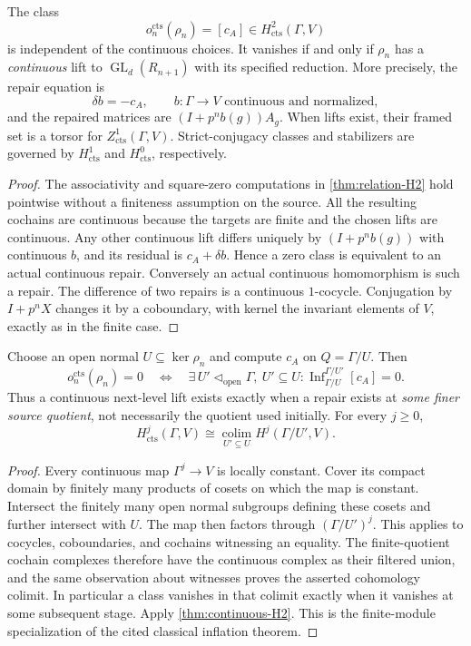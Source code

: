 \begin{theorem}\label{thm:continuous-H2}
The class
\[
 o_n^{\mathrm{cts}}(\rho_n)=[c_A]\in H^2_{\mathrm{cts}}(\Gamma,V)
\]
is independent of the continuous choices. It vanishes if and only if $\rho_n$ has a \emph{continuous} lift to $\operatorname{GL}_d(R_{n+1})$ with its specified reduction. More precisely, the repair equation is
\[
 \delta b=-c_A,\qquad b:\Gamma\to V\text{ continuous and normalized},
\]
and the repaired matrices are $(I+p^nb(g))A_g$. When lifts exist, their framed set is a torsor for $Z^1_{\mathrm{cts}}(\Gamma,V)$. Strict-conjugacy classes and stabilizers are governed by $H^1_{\mathrm{cts}}$ and $H^0_{\mathrm{cts}}$, respectively.
\end{theorem}
\begin{proof}
The associativity and square-zero computations in \cref{thm:relation-H2} hold pointwise without a finiteness assumption on the source. All the resulting cochains are continuous because the targets are finite and the chosen lifts are continuous. Any other continuous lift differs uniquely by $(I+p^nb(g))$ with continuous $b$, and its residual is $c_A+\delta b$. Hence a zero class is equivalent to an actual continuous repair. Conversely an actual continuous homomorphism is such a repair. The difference of two repairs is a continuous $1$-cocycle. Conjugation by $I+p^nX$ changes it by a coboundary, with kernel the invariant elements of $V$, exactly as in the finite case.
\end{proof}

\begin{theorem}\label{thm:source-inflation}
Choose an open normal $U\subseteq\ker\rho_n$ and compute $c_A$ on $Q=\Gamma/U$. Then
\[
 o_n^{\mathrm{cts}}(\rho_n)=0
 \quad\Longleftrightarrow\quad
 \exists\, U'\triangleleft_{\mathrm{open}}\Gamma,\ U'\subseteq U:
 \operatorname{Inf}_{\Gamma/U}^{\Gamma/U'}[c_A]=0.
\]
Thus a continuous next-level lift exists exactly when a repair exists at \emph{some finer source quotient}, not necessarily the quotient used initially. For every $j\geq0$,
\[
 H^j_{\mathrm{cts}}(\Gamma,V)
 \cong\underset{U'\subseteq U}{\operatorname{colim}}
 H^j(\Gamma/U',V).
\]
\end{theorem}
\begin{proof}
Every continuous map $\Gamma^j\to V$ is locally constant. Cover its compact domain by finitely many products of cosets on which the map is constant. Intersect the finitely many open normal subgroups defining these cosets and further intersect with $U$. The map then factors through $(\Gamma/U')^j$. This applies to cocycles, coboundaries, and cochains witnessing an equality. The finite-quotient cochain complexes therefore have the continuous complex as their filtered union, and the same observation about witnesses proves the asserted cohomology colimit. In particular a class vanishes in that colimit exactly when it vanishes at some subsequent stage. Apply \cref{thm:continuous-H2}. This is the finite-module specialization of the cited classical inflation theorem.
\end{proof}

